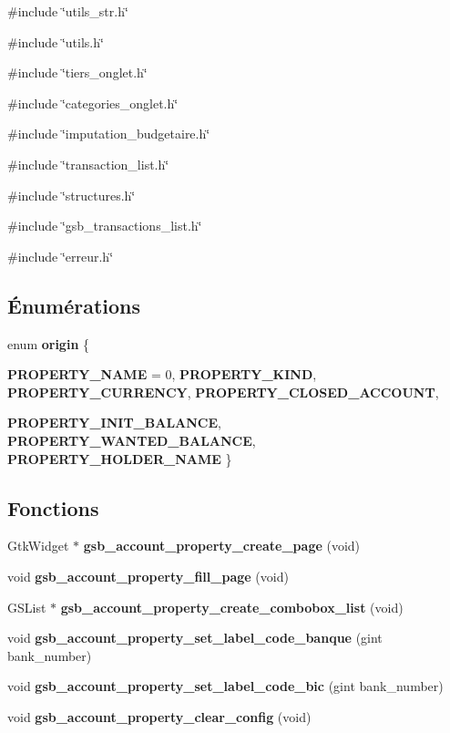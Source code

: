 {\ttfamily \#include \char`\"{}utils\_\-str.h\char`\"{}}\par
{\ttfamily \#include \char`\"{}utils.h\char`\"{}}\par
{\ttfamily \#include \char`\"{}tiers\_\-onglet.h\char`\"{}}\par
{\ttfamily \#include \char`\"{}categories\_\-onglet.h\char`\"{}}\par
{\ttfamily \#include \char`\"{}imputation\_\-budgetaire.h\char`\"{}}\par
{\ttfamily \#include \char`\"{}transaction\_\-list.h\char`\"{}}\par
{\ttfamily \#include \char`\"{}structures.h\char`\"{}}\par
{\ttfamily \#include \char`\"{}gsb\_\-transactions\_\-list.h\char`\"{}}\par
{\ttfamily \#include \char`\"{}erreur.h\char`\"{}}\par
\subsection*{Énumérations}
\begin{DoxyCompactItemize}
\item 
enum {\bf origin} \{ \par
{\bf PROPERTY\_\-NAME} =  0, 
{\bf PROPERTY\_\-KIND}, 
{\bf PROPERTY\_\-CURRENCY}, 
{\bf PROPERTY\_\-CLOSED\_\-ACCOUNT}, 
\par
{\bf PROPERTY\_\-INIT\_\-BALANCE}, 
{\bf PROPERTY\_\-WANTED\_\-BALANCE}, 
{\bf PROPERTY\_\-HOLDER\_\-NAME}
 \}
\end{DoxyCompactItemize}
\subsection*{Fonctions}
\begin{DoxyCompactItemize}
\item 
GtkWidget $\ast$ {\bf gsb\_\-account\_\-property\_\-create\_\-page} (void)
\item 
void {\bf gsb\_\-account\_\-property\_\-fill\_\-page} (void)
\item 
GSList $\ast$ {\bf gsb\_\-account\_\-property\_\-create\_\-combobox\_\-list} (void)
\item 
void {\bf gsb\_\-account\_\-property\_\-set\_\-label\_\-code\_\-banque} (gint bank\_\-number)
\item 
void {\bf gsb\_\-account\_\-property\_\-set\_\-label\_\-code\_\-bic} (gint bank\_\-number)
\item 
void {\bf gsb\_\-account\_\-property\_\-clear\_\-config} (void)
\end{DoxyCompactItemize}
